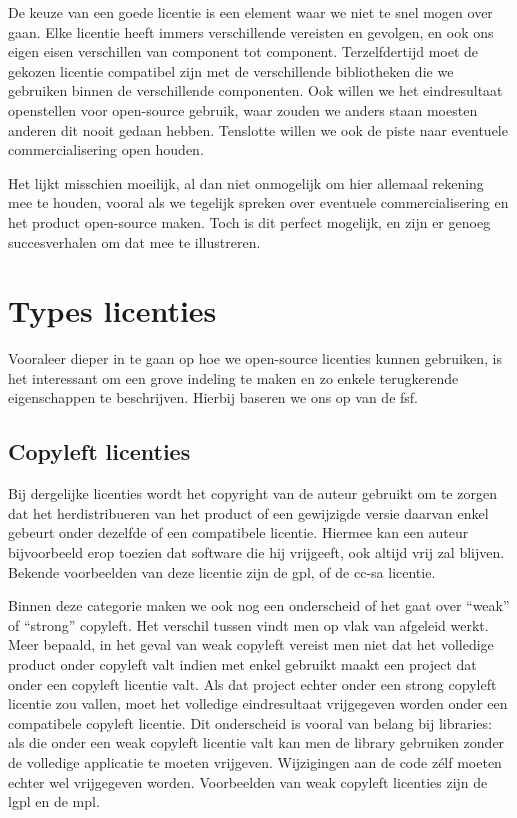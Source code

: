 De keuze van een goede licentie is een element waar we niet te snel mogen over gaan. Elke licentie heeft immers verschillende vereisten en gevolgen, en ook ons eigen eisen verschillen van component tot component. Terzelfdertijd moet de gekozen licentie compatibel zijn met de verschillende bibliotheken die we gebruiken binnen de verschillende componenten. Ook willen we het eindresultaat openstellen voor open-source gebruik, waar zouden we anders staan moesten anderen dit nooit gedaan hebben. Tenslotte willen we ook de piste naar eventuele commercialisering open houden.

Het lijkt misschien moeilijk, al dan niet onmogelijk om hier allemaal rekening mee te houden, vooral als we tegelijk spreken over eventuele commercialisering en het product open-source maken. Toch is dit perfect mogelijk, en zijn er genoeg succesverhalen om dat mee te illustreren.

\section{Types licenties}

Vooraleer dieper in te gaan op hoe we open-source licenties kunnen gebruiken, is het interessant om een grove indeling te maken en zo enkele terugkerende eigenschappen te beschrijven. Hierbij baseren we ons op  van de \ac{fsf}.

\subsection{Copyleft licenties}

Bij dergelijke licenties wordt het copyright van de auteur gebruikt om te zorgen dat het herdistribueren van het product of een gewijzigde versie daarvan enkel gebeurt onder dezelfde of een compatibele licentie. Hiermee kan een auteur bijvoorbeeld erop toezien dat software die hij vrijgeeft, ook altijd vrij zal blijven. Bekende voorbeelden van deze licentie zijn de \ac{gpl}, of de \ac{cc-sa} licentie.

Binnen deze categorie maken we ook nog een onderscheid of het gaat over ``weak'' of ``strong'' copyleft. Het verschil tussen vindt men op vlak van afgeleid werkt. Meer bepaald, in het geval van weak copyleft vereist men niet dat het volledige product onder copyleft valt indien met enkel gebruikt maakt een project dat onder een copyleft licentie valt. Als dat project echter onder een strong copyleft licentie zou vallen, moet het volledige eindresultaat vrijgegeven worden onder een compatibele copyleft licentie.
Dit onderscheid is vooral van belang bij libraries: als die onder een weak copyleft licentie valt kan men de library gebruiken zonder de volledige applicatie te moeten vrijgeven. Wijzigingen aan de code zélf moeten echter wel vrijgegeven worden. Voorbeelden van weak copyleft licenties zijn de \ac{lgpl} en de \ac{mpl}.

